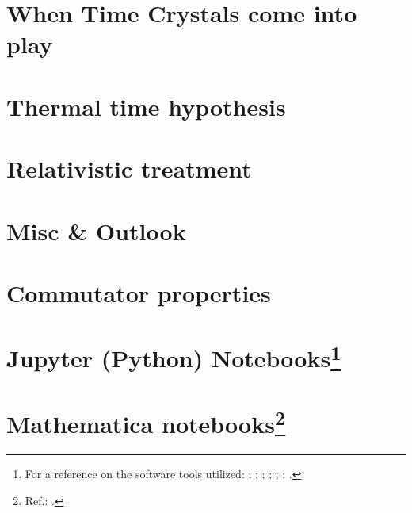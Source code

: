 \iftodo
\chapter{When Time Crystals come into play}

\fi

\iftodo
\chapter{Thermal time hypothesis}

\fi

\chapter{Relativistic treatment}

\iftodo

\fi

\iftodo
\chapter{Misc \& Outlook}

\fi

\appendix

\chapter{Commutator properties}


\chapter[Jupyter (Python) Notebooks]{Jupyter (Python) Notebooks\footnote{
  For a reference on the software tools utilized:
  \cite{comp:python+sci};
  \cite{comp:scipy};
  \cite{comp:sympy};
  \cite{comp:jupyter};
  \cite{comp:matplotlib};
  \cite{comp:numpy};
  \cite{comp:python+sci+eng}.
}}




\chapter[Mathematica notebooks]{Mathematica notebooks\footnote{
  Ref.: \cite{Wolfram}.
}}



\printbibliography[heading=bibintoc]


